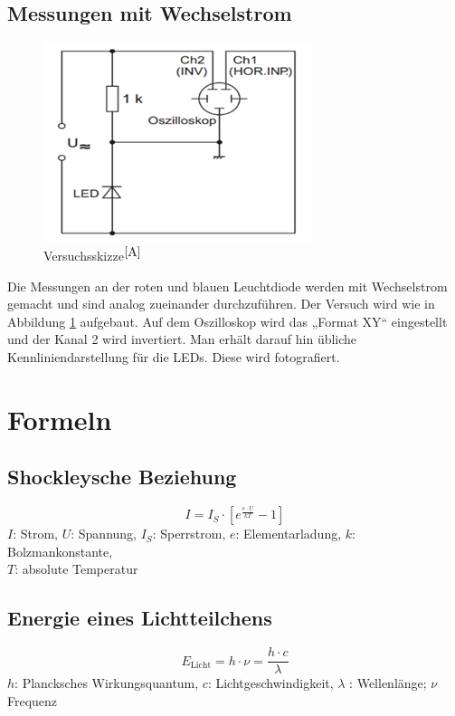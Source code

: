 \documentclass[fontsize=12pt]{scrartcl}
\begin{document}
\subsection{Messungen mit Wechselstrom}
 \begin{figure}[h!]
\centering
\includegraphics[scale=1]{Graphik/Versuch2}
\caption{Versuchsskizze$^{\cite{A}}$}
\label{2}
\end{figure}
\noindent
Die Messungen an der roten und blauen Leuchtdiode werden mit Wechselstrom gemacht und sind analog zueinander durchzuführen. Der Versuch wird wie in 
Abbildung \ref{2} aufgebaut. Auf dem Oszilloskop wird das „Format XY“ eingestellt und der Kanal 2 wird invertiert. Man erhält darauf hin übliche 
Kennliniendarstellung für die LEDs. Diese wird fotografiert.

\newpage


\section{Formeln}

\subsection{Shockleysche Beziehung} 

\begin{equation}
I=I_S\cdot[e^{\frac{e\cdot U}{kT}}-1]
\end{equation}
$I$: Strom, $U$: Spannung, $I_S$: Sperrstrom, $e$: Elementarladung, $k$: Bolzmankonstante, \\
$T$: absolute Temperatur

\subsection{Energie eines Lichtteilchens}

\begin{equation}
E_{\text{Licht}}=h\cdot \nu =\frac{h\cdot c}{\lambda}
\label{E}
\end{equation}
$h$: Plancksches Wirkungsquantum, $c$: Lichtgeschwindigkeit, $\lambda$ : Wellenlänge; $\nu$ Frequenz
\end{document}
